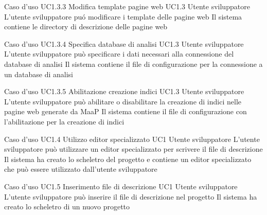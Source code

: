 \UCtitle
{Caso d'uso UC1.3.3}
{Modifica template pagine web}
\UC
{UC1.3}
{Utente sviluppatore}
{L'utente sviluppatore pu\'o modificare i template delle pagine web}
{Il sistema contiene le directory di descrizione delle pagine web}

\UCtitle
{Caso d'uso UC1.3.4}
{Specifica database di analisi}
\UC
{UC1.3}
{Utente sviluppatore}
{L'utente sviluppatore può specificare i dati necessari alla connessione del database di analisi}
{Il sistema contiene il file di configurazione per la connessione a un database di analisi}

\UCtitle
{Caso d'uso UC1.3.5}
{Abilitazione creazione indici}
\UC
{UC1.3}
{Utente sviluppatore}
{L'utente sviluppatore può abilitare o disabilitare la creazione di indici nelle pagine web generate da MaaP}
{Il sistema contiene il file di configurazione con l'abilitazione per la creazione di indici}

\UCtitle
{Caso d'uso UC1.4}
{Utilizzo editor specializzato}
\UC
{UC1}
{Utente sviluppatore}
{L'utente sviluppatore può utilizzare un editor specializzato per scrivere il file di descrizione}
{Il sistema ha creato lo scheletro del progetto e contiene un editor specializzato che può essere utilizzato dall'utente sviluppatore}

\UCtitle
{Caso d'uso UC1.5}
{Inserimento file di descrizione}
\UC
{UC1}
{Utente sviluppatore}
{L'utente sviluppatore può inserire il file di descrizione nel progetto}
{Il sistema ha creato lo scheletro di un nuovo progetto}


